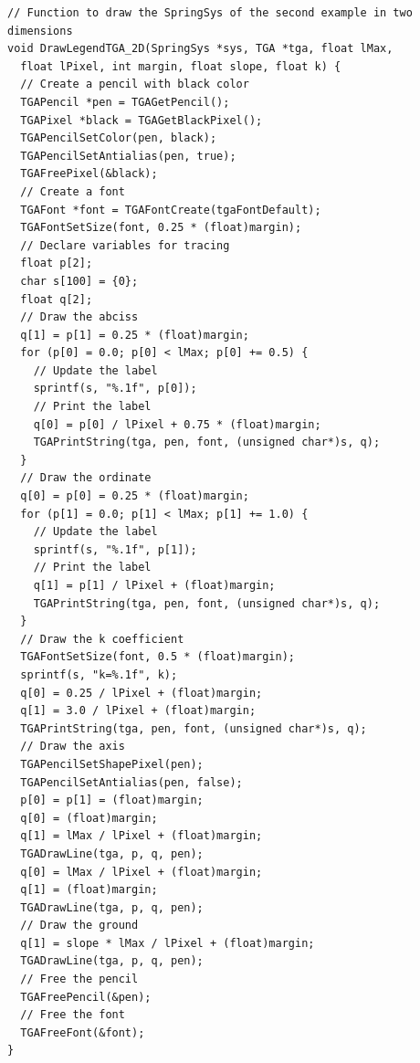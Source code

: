 \documentclass[12pt, a4paper]{article}
\begin{document}
\begin{scriptsize}
\begin{ttfamily}
\begin{lstlisting}
// Function to draw the SpringSys of the second example in two dimensions
void DrawLegendTGA_2D(SpringSys *sys, TGA *tga, float lMax, 
  float lPixel, int margin, float slope, float k) {
  // Create a pencil with black color
  TGAPencil *pen = TGAGetPencil();
  TGAPixel *black = TGAGetBlackPixel();
  TGAPencilSetColor(pen, black);
  TGAPencilSetAntialias(pen, true);
  TGAFreePixel(&black);
  // Create a font
  TGAFont *font = TGAFontCreate(tgaFontDefault);
  TGAFontSetSize(font, 0.25 * (float)margin);
  // Declare variables for tracing
  float p[2];
  char s[100] = {0};
  float q[2];
  // Draw the abciss
  q[1] = p[1] = 0.25 * (float)margin;
  for (p[0] = 0.0; p[0] < lMax; p[0] += 0.5) {
    // Update the label
    sprintf(s, "%.1f", p[0]);
    // Print the label
    q[0] = p[0] / lPixel + 0.75 * (float)margin;
    TGAPrintString(tga, pen, font, (unsigned char*)s, q);
  }
  // Draw the ordinate
  q[0] = p[0] = 0.25 * (float)margin;
  for (p[1] = 0.0; p[1] < lMax; p[1] += 1.0) {
    // Update the label
    sprintf(s, "%.1f", p[1]);
    // Print the label
    q[1] = p[1] / lPixel + (float)margin;
    TGAPrintString(tga, pen, font, (unsigned char*)s, q);
  }
  // Draw the k coefficient
  TGAFontSetSize(font, 0.5 * (float)margin);
  sprintf(s, "k=%.1f", k);
  q[0] = 0.25 / lPixel + (float)margin;
  q[1] = 3.0 / lPixel + (float)margin;
  TGAPrintString(tga, pen, font, (unsigned char*)s, q);
  // Draw the axis
  TGAPencilSetShapePixel(pen);
  TGAPencilSetAntialias(pen, false);
  p[0] = p[1] = (float)margin;
  q[0] = (float)margin;
  q[1] = lMax / lPixel + (float)margin;
  TGADrawLine(tga, p, q, pen);
  q[0] = lMax / lPixel + (float)margin;
  q[1] = (float)margin;
  TGADrawLine(tga, p, q, pen);
  // Draw the ground
  q[1] = slope * lMax / lPixel + (float)margin;
  TGADrawLine(tga, p, q, pen);
  // Free the pencil
  TGAFreePencil(&pen);
  // Free the font
  TGAFreeFont(&font);
}


\end{lstlisting}
\end{ttfamily}
\end{scriptsize}
\end{document}

